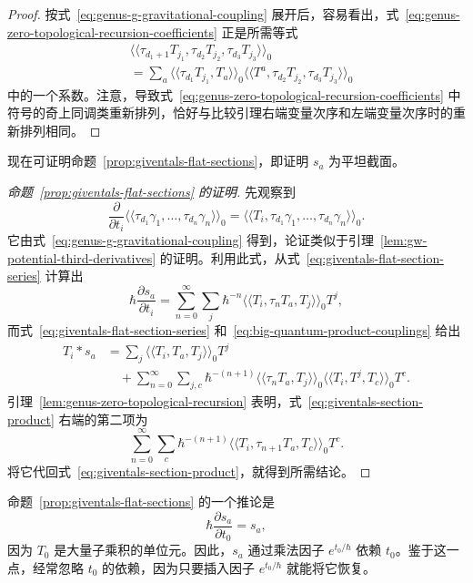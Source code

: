 \begin{proof}
按式~\eqref{eq:genus-g-gravitational-coupling} 展开后，容易看出，式~\eqref{eq:genus-zero-topological-recursion-coefficients} 正是所需等式
\[
\begin{aligned}
&\langle\!\langle\tau_{d_1+1}T_{j_1},\tau_{d_2}T_{j_2},\tau_{d_3}T_{j_3}\rangle\!\rangle_0\\
&=\sum_a\langle\!\langle\tau_{d_1}T_{j_1},T_a\rangle\!\rangle_0
\langle\!\langle T^a,\tau_{d_2}T_{j_2},\tau_{d_3}T_{j_3}\rangle\!\rangle_0
\end{aligned}
\]
中的一个系数。注意，导致式~\eqref{eq:genus-zero-topological-recursion-coefficients} 中符号的奇上同调类重新排列，恰好与比较引理右端变量次序和左端变量次序时的重新排列相同。
\end{proof}

现在可证明命题~\ref{prop:giventals-flat-sections}，即证明 $s_a$ 为平坦截面。
\begin{proof}[命题~\ref{prop:giventals-flat-sections} 的证明]
先观察到
\[
\frac{\partial}{\partial t_i}\langle\!\langle\tau_{d_1}\gamma_1,\ldots,\tau_{d_n}\gamma_n\rangle\!\rangle_0
=\langle\!\langle T_i,\tau_{d_1}\gamma_1,\ldots,\tau_{d_n}\gamma_n\rangle\!\rangle_0.
\]
它由式~\eqref{eq:genus-g-gravitational-coupling} 得到，论证类似于引理~\ref{lem:gw-potential-third-derivatives} 的证明。利用此式，从式~\eqref{eq:giventals-flat-section-series} 计算出
\[
\hbar\frac{\partial s_a}{\partial t_i}
=\sum_{n=0}^{\infty}\sum_j\hbar^{-n}
\langle\!\langle T_i,\tau_nT_a,T_j\rangle\!\rangle_0T^j,
\]
而式~\eqref{eq:giventals-flat-section-series} 和~\eqref{eq:big-quantum-product-couplings} 给出
\begin{equation}\label{eq:giventals-section-product}
\begin{aligned}
T_i*s_a
&=\sum_j\langle\!\langle T_i,T_a,T_j\rangle\!\rangle_0T^j\\
&\quad+\sum_{n=0}^{\infty}\sum_{j,c}\hbar^{-(n+1)}
\langle\!\langle\tau_nT_a,T_j\rangle\!\rangle_0
\langle\!\langle T_i,T^j,T_c\rangle\!\rangle_0T^c.
\end{aligned}
\end{equation}
引理~\ref{lem:genus-zero-topological-recursion} 表明，式~\eqref{eq:giventals-section-product} 右端的第二项为
\[
\sum_{n=0}^{\infty}\sum_c\hbar^{-(n+1)}
\langle\!\langle T_i,\tau_{n+1}T_a,T_c\rangle\!\rangle_0T^c.
\]
将它代回式~\eqref{eq:giventals-section-product}，就得到所需结论。
\end{proof}

命题~\ref{prop:giventals-flat-sections} 的一个推论是
\[
\hbar\frac{\partial s_a}{\partial t_0}=s_a,
\]
因为 $T_0$ 是大量子乘积的单位元。因此，$s_a$ 通过乘法因子 $e^{t_0/\hbar}$ 依赖 $t_0$。鉴于这一点，经常忽略 $t_0$ 的依赖，因为只要插入因子 $e^{t_0/\hbar}$ 就能将它恢复。

